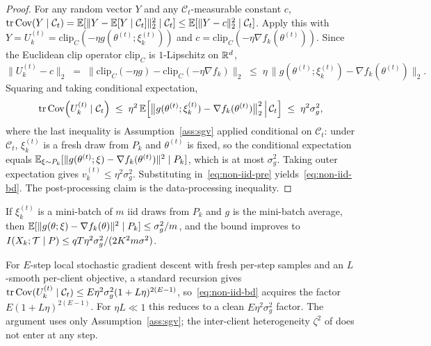 \begin{proof}
For any random vector \(Y\) and any \(\mathcal C_t\)-measurable constant \(c\), \(\operatorname{tr}\operatorname{Cov}(Y\mid\mathcal C_t)=\mathbb{E}[\|Y-\mathbb{E}[Y\mid\mathcal C_t]\|_2^2\mid\mathcal C_t]\le\mathbb{E}[\|Y-c\|_2^2\mid\mathcal C_t]\). Apply this with \(Y=U_k^{(t)}=\mathrm{clip}_C(-\eta g(\theta^{(t)};\xi_k^{(t)}))\) and \(c=\mathrm{clip}_C(-\eta\nabla f_k(\theta^{(t)}))\). Since the Euclidean clip operator \(\mathrm{clip}_C\) is \(1\)-Lipschitz on \(\mathbb{R}^d\),
\[
\bigl\|U_k^{(t)}-c\bigr\|_2 \;=\; \bigl\|\mathrm{clip}_C(-\eta g)-\mathrm{clip}_C(-\eta\nabla f_k)\bigr\|_2 \;\le\; \eta\,\bigl\|g(\theta^{(t)};\xi_k^{(t)})-\nabla f_k(\theta^{(t)})\bigr\|_2.
\]
Squaring and taking conditional expectation,
\[
\operatorname{tr}\operatorname{Cov}\!\left(U_k^{(t)}\mid\mathcal C_t\right) \;\le\; \eta^2\,\mathbb{E}\!\left[\bigl\|g(\theta^{(t)};\xi_k^{(t)})-\nabla f_k(\theta^{(t)})\bigr\|_2^2\,\Big|\,\mathcal C_t\right] \;\le\; \eta^2\sigma_g^2,
\]
where the last inequality is Assumption~\ref{ass:sgv} applied conditional on \(\mathcal C_t\): under \(\mathcal C_t\), \(\xi_k^{(t)}\) is a fresh draw from \(P_k\) and \(\theta^{(t)}\) is fixed, so the conditional expectation equals \(\mathbb{E}_{\xi\sim P_k}[\|g(\theta^{(t)};\xi)-\nabla f_k(\theta^{(t)})\|^2\mid P_k]\), which is at most \(\sigma_g^2\). Taking outer expectation gives \(v_k^{(t)}\le\eta^2\sigma_g^2\). Substituting in~\eqref{eq:non-iid-pre} yields~\eqref{eq:non-iid-bd}. The post-processing claim is the data-processing inequality.
\end{proof}

\begin{remark}\label{rem:minibatch}
If \(\xi_k^{(t)}\) is a mini-batch of \(m\) iid draws from \(P_k\) and \(g\) is the mini-batch average, then \(\mathbb{E}[\|g(\theta;\xi)-\nabla f_k(\theta)\|^2\mid P_k]\le\sigma_g^2/m\), and the bound improves to \(I(X_k;\mathcal{T}\mid P)\le qT\eta^2\sigma_g^2/(2K^2 m\sigma^2)\).
\end{remark}

\begin{remark}\label{rem:multistep}
For \(E\)-step local stochastic gradient descent with fresh per-step samples and an \(L\)-smooth per-client objective, a standard recursion \citep[e.g.][Lemma~5]{Koloskova2020Unified} gives
\(\operatorname{tr}\operatorname{Cov}(U_k^{(t)}\mid\mathcal C_t)\le E\eta^2\sigma_g^2(1+L\eta)^{2(E-1)}\), so~\eqref{eq:non-iid-bd} acquires the factor \(E(1+L\eta)^{2(E-1)}\). For \(\eta L\ll 1\) this reduces to a clean \(E\eta^2\sigma_g^2\) factor. The argument uses only Assumption~\ref{ass:sgv}; the inter-client heterogeneity \(\zeta^2\) of \citet{Bornstein2022SWIFT} does not enter at any step.
\end{remark}

